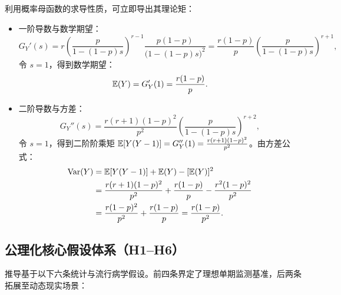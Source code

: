 利用概率母函数的求导性质，可立即导出其理论矩：
\begin{itemize}
  \item 一阶导数与数学期望：
  \begin{equation}
    G_Y'(s) = r \left( \frac{p}{1 - (1-p)s} \right)^{r-1} \frac{p(1-p)}{\big(1-(1-p)s\big)^2} = \frac{r(1-p)}{p} \left( \frac{p}{1 - (1-p)s} \right)^{r+1},
  \end{equation}
  令 $s = 1$，得到数学期望：
  \begin{equation}
    \mathbb{E}(Y) = G_Y'(1) = \frac{r(1-p)}{p}.
    \label{eq:nb-mean}
  \end{equation}
  \item 二阶导数与方差：
  \begin{equation}
    G_Y''(s) = \frac{r(r+1)(1-p)^2}{p^2} \left( \frac{p}{1 - (1-p)s} \right)^{r+2},
  \end{equation}
  令 $s = 1$，得到二阶阶乘矩 $\mathbb{E}[Y(Y-1)] = G_Y''(1) = \frac{r(r+1)(1-p)^2}{p^2}$。由方差公式：
  \begin{align}
    \mathrm{Var}(Y) &= \mathbb{E}[Y(Y-1)] + \mathbb{E}(Y) - [\mathbb{E}(Y)]^2 \nonumber \\
    &= \frac{r(r+1)(1-p)^2}{p^2} + \frac{r(1-p)}{p} - \frac{r^2(1-p)^2}{p^2} \nonumber \\
    &= \frac{r(1-p)^2}{p^2} + \frac{r(1-p)}{p} = \frac{r(1-p)}{p^2}.
    \label{eq:nb-var}
  \end{align}
\end{itemize}

\subsection{公理化核心假设体系（H1--H6）}

推导基于以下六条统计与流行病学假设。前四条界定了理想单期监测基准，后两条拓展至动态现实场景：

